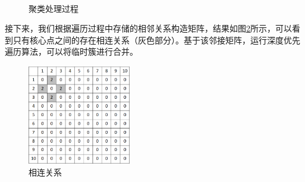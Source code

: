 \begin{figure}[htbp]
	\centering
	\\
	\caption{聚类处理过程}
	\label{db_process}
\end{figure}

接下来，我们根据遍历过程中存储的相邻关系构造矩阵，结果如图\ref{db_matrix}所示，可以看到只有核心点之间的存在相连关系（灰色部分）。基于该邻接矩阵，运行深度优先遍历算法，可以将临时簇进行合并。

\begin{figure}[htbp]
	\centering
	\includegraphics[width=0.4\textwidth]{img/db_matrix.png}
	\caption{相连关系}
	\label{db_matrix}
\end{figure}

